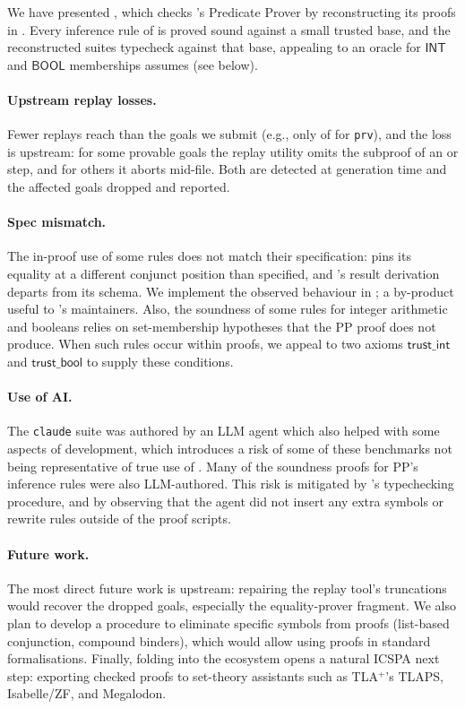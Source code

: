 We have presented \tool, which checks \ab's Predicate Prover by reconstructing
its proofs in \lp.
%
Every inference rule of \pp{} is proved sound against a small trusted base,
and the reconstructed suites typecheck against that base, appealing to an
oracle for $\mathsf{INT}$ and $\mathsf{BOOL}$ memberships \pp{} assumes
(see below).

\paragraph{Upstream replay losses.}
%
Fewer replays reach \tool{} than the goals we submit
(e.g., only \prvReplayed{} of \prvGoals{} for \texttt{prv}),
and the loss is upstream: for some provable goals the replay utility
omits the subproof of an  or  step,
and for others it aborts mid-file.
%
Both are detected at generation time and the affected goals dropped and reported.

\paragraph{Spec mismatch.}
The in-proof use of some rules does not match their specification:
 pins its equality at a different conjunct position than specified,
and 's result derivation departs from its schema.
%
We implement the observed behaviour in \tool{};
a by-product useful to \pp's maintainers.
%
Also, the soundness of some rules for integer arithmetic and booleans
relies on set-membership hypotheses that the PP proof does not produce.
%
When such rules occur within proofs, we appeal to two axioms
$\mathsf{trust\_int}$ and $\mathsf{trust\_bool}$ to supply these conditions.
%
%

\paragraph{Use of AI.}
The \texttt{claude} suite was authored by an LLM agent which also helped
with some aspects of development, which introduces a risk of some of these
benchmarks not being representative of true use of \pp{}.
%
Many of the soundness proofs for PP's inference rules were also LLM-authored.
%
This risk is mitigated by \lp{}'s typechecking procedure,
and by observing that the agent did not insert any extra symbols
or rewrite rules outside of the proof scripts.

\paragraph{Future work.}
The most direct future work is upstream: repairing the replay tool's
truncations would recover the dropped goals, especially the equality-prover
fragment.
%
We also plan to develop a procedure to eliminate \pp{} specific symbols
from proofs (list-based conjunction, compound binders), which would allow
using \pp{} proofs in standard \lp formalisations.
%
Finally, folding \pp{} into the \dedukti{} ecosystem opens a natural ICSPA next
step: exporting checked \ab{} proofs to set-theory assistants such as TLA$^+$'s
TLAPS, Isabelle/ZF, and Megalodon.

